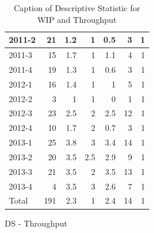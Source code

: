 \documentclass[UKenglish]{ifimaster}  %
\begin{document}
\begin{appendices}
\begin{table}[!htbp]
\begin{adjustwidth}{-2.5cm}{}
\begin{subfigure}[b]{0.3\textwidth}
{\begin{tabular}{ | l | r | r | r | r | r | r | }
 2011-2  & 21 & 1.2 & 1 & 0.5 & 3 & 1 \\ \hline
 2011-3  & 15 & 1.7 & 1 & 1.1 & 4 & 1 \\ \hline
 2011-4  & 19 & 1.3 & 1 & 0.6 & 3 & 1 \\ \hline
 2012-1  & 16 & 1.4 & 1 & 1 & 5 & 1 \\ \hline
 2012-2  & 3 & 1 & 1 & 0 &1 & 1 \\ \hline
 2012-3  & 23 & 2.5 & 2 & 2.5 & 12 & 1 \\ \hline
 2012-4  & 10 & 1.7 & 2 & 0.7 & 3 & 1 \\ \hline
 2013-1  & 25 & 3.8 & 3 & 3.4 & 14 & 1 \\ \hline
 2013-2  & 20 & 3.5 & 2.5 & 2.9 & 9 & 1 \\ \hline
 2013-3  & 21 & 3.5 & 2 & 3.5 & 13 & 1 \\ \hline
 2013-4  & 4 & 3.5 & 3 & 2.6 & 7 & 1 \\ \hline
 Total  & 191 & 2.3 & 1 & 2.4 & 14 & 1 \\ \hline
\end{tabular}
}
\caption{DS - Throughput}
 \label{DS:Throughput:8}
\end{subfigure}
\end{adjustwidth}
\caption[Optional caption for list of figures]{Caption of Descriptive Statistic for WIP and Throughput}
\label{DS:8:1}
\end{table}


\end{appendices}
\end{document}
